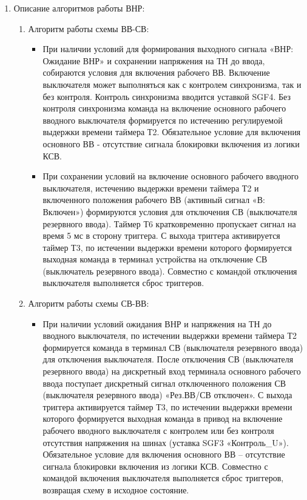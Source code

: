 \begin{enumerate}
\item
Описание алгоритмов работы ВНР:
\begin{enumerate}[label=\arabic*), noitemsep]
    \item Алгоритм работы схемы ВВ-СВ:
    \begin{itemize}
        \item При наличии условий для формирования выходного сигнала «ВНР: Ожидание ВНР» и сохранении напряжения на ТН до ввода, собираются условия для включения рабочего ВВ. Включение выключателя  может  выполняться  как  с  контролем  синхронизма,  так  и  без  контроля.  Контроль  синхронизма  вводится уставкой  SGF4.  Без  контроля  синхронизма  команда  на  включение  основного  рабочего  вводного выключателя  формируется  по  истечению  регулируемой  выдержки  времени  таймера  Т2.  Обязательное условие для включения основного ВВ - отсутствие сигнала блокировки включения из логики КСВ.
        \item При сохранении условий на включение основного рабочего вводного выключателя, истечению выдержки времени таймера Т2 и  включенного положения рабочего ВВ (активный сигнал «В: Включен») формируются условия для отключения СВ (выключателя резервного ввода). Таймер Т6 кратковременно пропускает  сигнал  на  время  5  мс  в сторону триггера. С выхода триггера  активируется таймер Т3, по  истечении выдержки времени которого формируется  выходная  команда  в  терминал устройства  на  отключение  СВ  (выключатель  резервного  ввода). Совместно с командой отключения выключателя выполняется сброс триггеров.         
    \end{itemize}
    \item Алгоритм работы схемы СВ-ВВ:
    \begin{itemize}
        \item При наличии условий ожидания ВНР и напряжения на ТН до вводного выключателя, по истечении выдержки времени таймера Т2 формируется команда в терминал СВ (выключателя резервного ввода) для отключения  выключателя.  После  отключения  СВ  (выключателя  резервного  ввода)  на  дискретный  вход терминала  основного  рабочего  ввода  поступает  дискретный  сигнал  отключенного  положения  СВ (выключателя резервного ввода) «Рез.ВВ/СВ отключен». С выхода триггера  активируется  таймер  Т3,  по  истечении выдержки времени которого формируется  выходная  команда в привод на включение рабочего вводного выключателя с контролем или без контроля отсутствия напряжения на шинах (уставка  SGF3 «Контроль\_U»).  Обязательное условие для  включения  основного  ВВ  --  отсутствие  сигнала  блокировки включения из логики КСВ. Совместно с командой включения выключателя выполняется сброс триггеров, возвращая схему в исходное состояние.
    \end{itemize}
\end{enumerate}


\end{enumerate}
